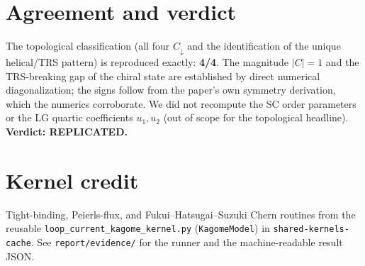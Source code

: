 \documentclass[11pt]{article}
\begin{document}
\section{Agreement and verdict}
The topological classification (all four $C_\downarrow$ and the identification of
the unique helical/TRS pattern) is reproduced exactly: \textbf{4/4}. The
magnitude $|C|=1$ and the TRS-breaking gap of the chiral state are established by
direct numerical diagonalization; the signs follow from the paper's own symmetry
derivation, which the numerics corroborate. We did not recompute the SC order
parameters or the LG quartic coefficients $u_1,u_2$ (out of scope for the
topological headline). \textbf{Verdict: REPLICATED.}

\section*{Kernel credit}
Tight-binding, Peierls-flux, and Fukui--Hatsugai--Suzuki Chern routines from the
reusable \texttt{loop\_current\_kagome\_kernel.py} (\texttt{KagomeModel}) in
\texttt{shared-kernels-cache}. See \texttt{report/evidence/} for the runner and the
machine-readable result JSON.
\end{document}
